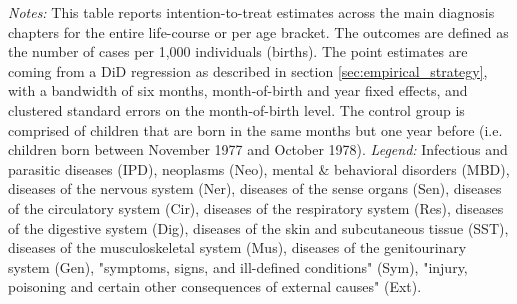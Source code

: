 \documentclass[11pt, a4paper,draft]{article} %
\begin{document}
\begin{table}[H]
\begin{threeparttable}
{\begin{tabular}{l*{5}{c}}
				\bottomrule 
		\end{tabular}}
	\end{threeparttable} 
	\begin{minipage}{0.95\linewidth}
		\scriptsize \emph{Notes:} This table reports intention-to-treat estimates across the main diagnosis chapters for the entire life-course or per age bracket. The outcomes are defined as the number of cases per 1,000 individuals (births). The point estimates are coming from a DiD regression as described in section \ref{sec:empirical_strategy}, with a bandwidth of six months, month-of-birth and year fixed effects, and clustered standard errors on the month-of-birth level. The control group is comprised of children that are born in the same months but one year before (i.e. children born between November 1977 and October 1978).\newline
		\emph{Legend:} Infectious and parasitic diseases (IPD), neoplasms (Neo), mental \& behavioral disorders (MBD), diseases of the nervous system (Ner), diseases of the sense organs (Sen), diseases of the circulatory system (Cir), diseases of the respiratory system (Res), diseases of the digestive system (Dig), diseases of the skin and subcutaneous tissue (SST), diseases of the musculoskeletal system (Mus), diseases of the genitourinary system (Gen), "symptoms, signs, and ill-defined conditions" (Sym), "injury, poisoning and certain other consequences of external causes" (Ext).
	\end{minipage}
\end{table} 
\vspace*{\fill}\clearpage 
\restoregeometry



\end{document}

